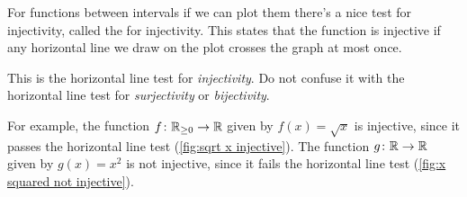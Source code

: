 \documentclass[fleqn]{LectureClass/LectureClass}
\begin{document}
    For functions between intervals if we can plot them there's a nice test for injectivity, called the  for injectivity.
    This states that the function is injective if any horizontal line we draw on the plot crosses the graph at most once.
    
    \begin{wrn}
        This is the horizontal line test for \emph{injectivity}. Do not confuse it with the horizontal line test for \emph{surjectivity} or \emph{bijectivity}.
    \end{wrn}
    
    For example, the function \(f \colon \mathbb{R}_{\ge0} \to \mathbb{R}\) given by \(f(x) = \sqrt{x}\) is injective, since it passes the horizontal line test (\cref{fig:sqrt x injective}).
    The function \(g \colon \mathbb{R} \to \mathbb{R}\) given by \(g(x) = x^2\) is not injective, since it fails the horizontal line test (\cref{fig:x squared not injective}).
    
\end{document}
